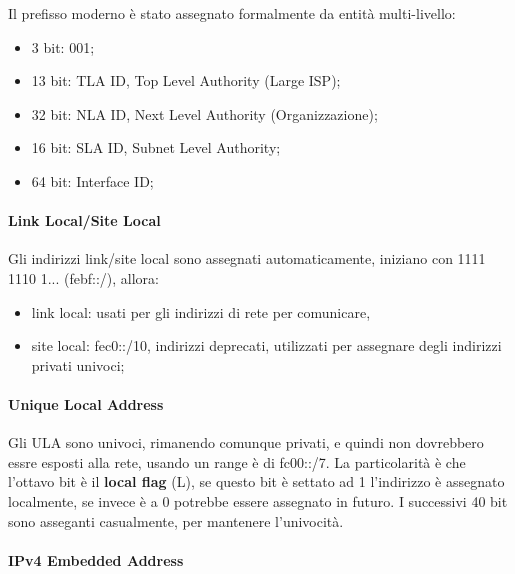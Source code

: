 \documentclass[12pt]{article}
\begin{document}
Il prefisso moderno \`e stato assegnato formalmente da entit\`a multi-livello:
\begin{itemize}
    \item 3 bit: 001;
    \item 13 bit: TLA ID, Top Level Authority (Large ISP);
    \item 32 bit: NLA ID, Next Level Authority (Organizzazione);
    \item 16 bit: SLA ID, Subnet Level Authority;
    \item 64 bit: Interface ID;
\end{itemize}


\paragraph{Link Local/Site Local}
Gli indirizzi link/site local sono assegnati automaticamente, iniziano con 1111 1110 1... (febf::/), allora:
\begin{itemize}
    \item link local: usati per gli indirizzi di rete per comunicare,
    \item site local: fec0::/10, indirizzi deprecati, utilizzati per assegnare degli indirizzi privati univoci;
\end{itemize}


\paragraph{Unique Local Address}
Gli ULA sono univoci, rimanendo comunque privati, e quindi non dovrebbero essre esposti alla rete, usando un range \`e di fc00::/7. La particolarit\`a \`e che l'ottavo bit \`e il \textbf{local flag} (L), se questo bit \`e settato ad 1 l'indirizzo \`e assegnato localmente, se invece \`e a 0 potrebbe essere assegnato in futuro. I successivi 40 bit sono asseganti casualmente, per mantenere l'univocit\`a.

\paragraph{IPv4 Embedded Address}
\end{document}
